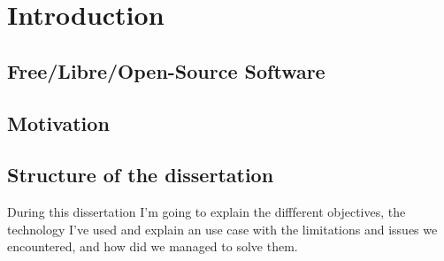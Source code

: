 \documentclass[a4paper, 12pt]{book}
\begin{document}
\tableofcontents
\cleardoublepage
\listoffigures %



\cleardoublepage
\chapter{Introduction}
\label{sec:intro} %





\section{Free/Libre/Open-Source Software}
\label{sec:}

\section{Motivation}
\label{sec:}


\section{Structure of the dissertation}
\label{sec:estructura}

During this dissertation I'm going to explain the diffferent objectives, the technology I've used and explain an use case with the limitations and issues we encountered, and how did we managed to solve them.
\end{document}
